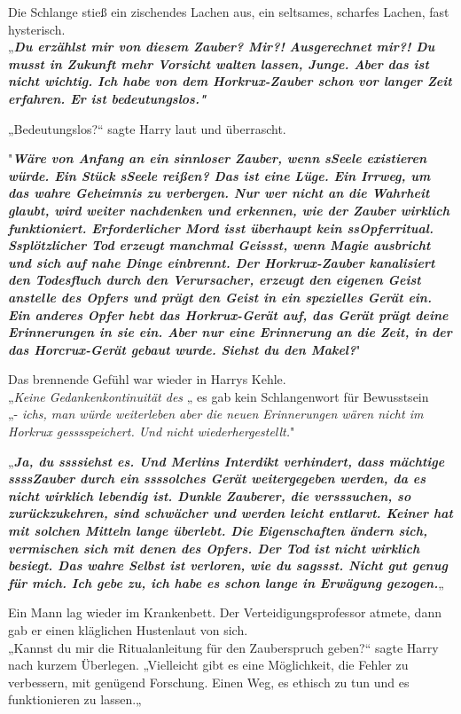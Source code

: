 {Die Schlange stieß ein zischendes Lachen aus, ein seltsames, scharfes Lachen, fast hysterisch.\\ „\textbf{\emph{Du erzählst mir von diesem Zauber? Mir?! Ausgerechnet mir?! Du musst in Zukunft mehr Vorsicht walten lassen, Junge. Aber das ist nicht wichtig. Ich habe von dem Horkrux-Zauber schon vor langer Zeit erfahren. Er ist bedeutungslos."}}

„Bedeutungslos?“ sagte Harry laut und überrascht.

"\textbf{\emph{Wäre von Anfang an ein sinnloser Zauber, wenn sSeele existieren würde. Ein Stück sSeele reißen? Das ist eine Lüge. Ein Irrweg, um das wahre Geheimnis zu verbergen. Nur wer nicht an die Wahrheit glaubt, wird weiter nachdenken und erkennen, wie der Zauber wirklich funktioniert. Erforderlicher Mord isst überhaupt kein ssOpferritual. Ssplötzlicher Tod erzeugt manchmal Geissst, wenn Magie ausbricht und sich auf nahe Dinge einbrennt. Der Horkrux-Zauber kanalisiert den Todesfluch durch den Verursacher, erzeugt den eigenen Geist anstelle des Opfers und prägt den Geist in ein spezielles Gerät ein. Ein anderes Opfer hebt das Horkrux-Gerät auf, das Gerät prägt deine Erinnerungen in sie ein. Aber nur eine Erinnerung an die Zeit, in der das Horcrux-Gerät gebaut wurde. Siehst du den Makel?}}"

Das brennende Gefühl war wieder in Harrys Kehle.\\ „\emph{Keine Gedankenkontinuität des} „ es gab kein Schlangenwort für Bewusstsein\\ „- \emph{ichs, man würde weiterleben aber die neuen Erinnerungen wären nicht im Horkrux gesssspeichert. Und nicht wiederhergestellt.}"

„\textbf{\emph{Ja, du ssssiehst es. Und Merlins Interdikt verhindert, dass mächtige ssssZauber durch ein ssssolches Gerät weitergegeben werden, da es nicht wirklich lebendig ist. Dunkle Zauberer, die versssuchen, so zurückzukehren, sind schwächer und werden leicht entlarvt. Keiner hat mit solchen Mitteln lange überlebt. Die Eigenschaften ändern sich, vermischen sich mit denen des Opfers. Der Tod ist nicht wirklich besiegt. Das wahre Selbst ist verloren, wie du sagssst. Nicht gut genug für mich. Ich gebe zu, ich habe es schon lange in Erwägung gezogen.}}„

Ein Mann lag wieder im Krankenbett. Der Verteidigungsprofessor atmete, dann gab er einen kläglichen Hustenlaut von sich.\\ „Kannst du mir die Ritualanleitung für den Zauberspruch geben?“ sagte Harry nach kurzem Überlegen. „Vielleicht gibt es eine Möglichkeit, die Fehler zu verbessern, mit genügend Forschung. Einen Weg, es ethisch zu tun und es funktionieren zu lassen.„

}
